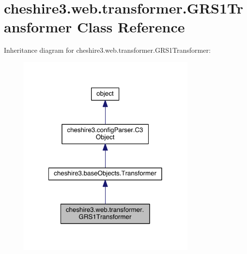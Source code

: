 \hypertarget{classcheshire3_1_1web_1_1transformer_1_1_g_r_s1_transformer}{\section{cheshire3.\-web.\-transformer.\-G\-R\-S1\-Transformer Class Reference}
\label{classcheshire3_1_1web_1_1transformer_1_1_g_r_s1_transformer}
}


Inheritance diagram for cheshire3.\-web.\-transformer.\-G\-R\-S1\-Transformer\-:
\nopagebreak
\begin{figure}[H]
\begin{center}
\leavevmode
\includegraphics[width=254pt]{classcheshire3_1_1web_1_1transformer_1_1_g_r_s1_transformer__inherit__graph}
\end{center}
\end{figure}


